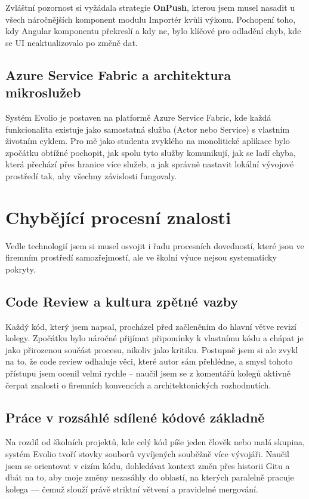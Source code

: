 Zvláštní pozornost si vyžádala strategie \textbf{OnPush}, kterou jsem musel nasadit u všech náročnějších komponent modulu Importér kvůli výkonu. Pochopení toho, kdy Angular komponentu překreslí a kdy ne, bylo klíčové pro odladění chyb, kde se UI neaktualizovalo po změně dat.

\subsection{Azure Service Fabric a architektura mikroslužeb}

Systém Evolio je postaven na platformě Azure Service Fabric, kde každá funkcionalita existuje jako samostatná služba (Actor nebo Service) s vlastním životním cyklem. Pro mě jako studenta zvyklého na monolitické aplikace bylo zpočátku obtížné pochopit, jak spolu tyto služby komunikují, jak se ladí chyba, která přechází přes hranice více služeb, a jak správně nastavit lokální vývojové prostředí tak, aby všechny závislosti fungovaly.

\section{Chybějící procesní znalosti}

Vedle technologií jsem si musel osvojit i řadu procesních dovedností, které jsou ve firemním prostředí samozřejmostí, ale ve školní výuce nejsou systematicky pokryty.

\subsection{Code Review a kultura zpětné vazby}

Každý kód, který jsem napsal, procházel před začleněním do hlavní větve revizí kolegy. Zpočátku bylo náročné přijímat připomínky k vlastnímu kódu a chápat je jako přirozenou součást procesu, nikoliv jako kritiku. Postupně jsem si ale zvykl na to, že code review odhaluje věci, které autor sám přehlédne, a smysl tohoto přístupu jsem ocenil velmi rychle -- naučil jsem se z komentářů kolegů aktivně čerpat znalosti o firemních konvencích a architektonických rozhodnutích.

\subsection{Práce v rozsáhlé sdílené kódové základně}

Na rozdíl od školních projektů, kde celý kód píše jeden člověk nebo malá skupina, systém Evolio tvoří stovky souborů vyvíjených souběžně více vývojáři. Naučil jsem se orientovat v cizím kódu, dohledávat kontext změn přes historii Gitu a dbát na to, aby moje změny nezasáhly do oblastí, na kterých paralelně pracuje kolega — čemuž slouží právě striktní větvení a pravidelné mergování.